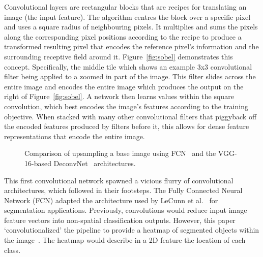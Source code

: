 \documentclass[12pt,twoside]{report}
\begin{document}
Convolutional layers are rectangular blocks that are recipes for translating an image (the input feature). The algorithm centres the block over a specific pixel and uses a square radius of neighbouring pixels. It multiplies and sums the pixels along the corresponding pixel positions according to the recipe to produce a transformed resulting pixel that encodes the reference pixel's information and the surrounding receptive field around it. Figure~\ref{fig:sobel} demonstrates this concept. Specifically, the middle tile which shows an example 3x3 convolutional filter being applied to a zoomed in part of the image. This filter slides across the entire image and encodes the entire image which produces the output on the right of Figure~\ref{fig:sobel}. A network then learns values within the square convolution, which best encodes the image's features according to the training objective. When stacked with many other convolutional filters that piggyback off the encoded features produced by filters before it, this allows for dense feature representations that encode the entire image.

\begin{figure}[H]
  \centering
  \caption{Comparison of upsampling a base image using FCN~\cite{fully-CNNs-for-semantic-segmentation} and the VGG-16-based DeconvNet~\cite{noh2015learning, simonyan2014very} architectures.}\label{fig:fcn-vs-deconvnet}
\end{figure}

This first convolutional network spawned a vicious flurry of convolutional architectures, which followed in their footsteps. The Fully Connected Neural Network (FCN) adapted the architecture used by LeCunn et al.~\cite{Lenet1998} for segmentation applications. Previously, convolutions would reduce input image feature vectors into non-spatial classification outputs. However, this paper `convolutionalized' the pipeline to provide a heatmap of segmented objects within the image~\cite{fully-CNNs-for-semantic-segmentation}. The heatmap would describe in a 2D feature the location of each class.
\end{document}
